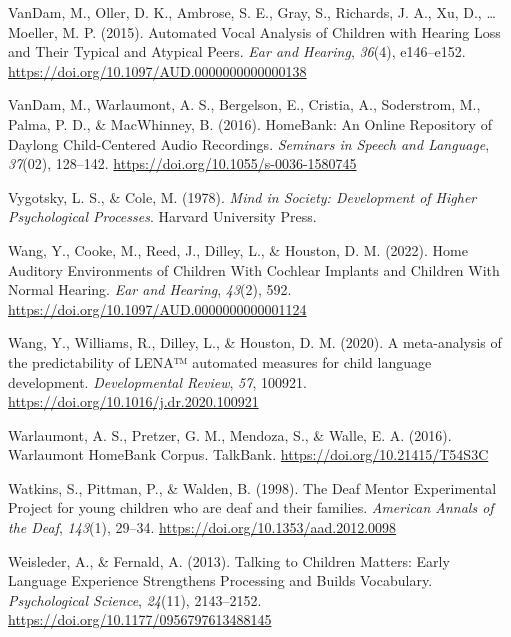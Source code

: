 \documentclass[
  man]{apa6}
\newlength{\cslhangindent}
\newlength{\cslentryspacingunit} %
\newenvironment{CSLReferences}[2] %
 {%
  \setlength{\parindent}{0pt}
  \ifodd #1
  \let\oldpar\par
  \def\par{\hangindent=\cslhangindent\oldpar}
  \fi
  \setlength{\parskip}{#2\cslentryspacingunit}
 }%
 {}
\begin{document}
\begin{CSLReferences}{1}{0}
\leavevmode{}%
VanDam, M., Oller, D. K., Ambrose, S. E., Gray, S., Richards, J. A., Xu, D., \ldots{} Moeller, M. P. (2015). Automated {Vocal Analysis} of {Children} with {Hearing Loss} and {Their Typical} and {Atypical Peers}. \emph{Ear and Hearing}, \emph{36}(4), e146--e152. \url{https://doi.org/10.1097/AUD.0000000000000138}

\leavevmode{}%
VanDam, M., Warlaumont, A. S., Bergelson, E., Cristia, A., Soderstrom, M., Palma, P. D., \& MacWhinney, B. (2016). {HomeBank}: {An Online Repository} of {Daylong Child-Centered Audio Recordings}. \emph{Seminars in Speech and Language}, \emph{37}(02), 128--142. \url{https://doi.org/10.1055/s-0036-1580745}

\leavevmode{}%
Vygotsky, L. S., \& Cole, M. (1978). \emph{Mind in {Society}: {Development} of {Higher Psychological Processes}}. {Harvard University Press}.

\leavevmode{}%
Wang, Y., Cooke, M., Reed, J., Dilley, L., \& Houston, D. M. (2022). Home {Auditory Environments} of {Children With Cochlear Implants} and {Children With Normal Hearing}. \emph{Ear and Hearing}, \emph{43}(2), 592. \url{https://doi.org/10.1097/AUD.0000000000001124}

\leavevmode{}%
Wang, Y., Williams, R., Dilley, L., \& Houston, D. M. (2020). A meta-analysis of the predictability of {LENA}™ automated measures for child language development. \emph{Developmental Review}, \emph{57}, 100921. \url{https://doi.org/10.1016/j.dr.2020.100921}

\leavevmode{}%
Warlaumont, A. S., Pretzer, G. M., Mendoza, S., \& Walle, E. A. (2016). Warlaumont {HomeBank Corpus}. {TalkBank}. \url{https://doi.org/10.21415/T54S3C}

\leavevmode{}%
Watkins, S., Pittman, P., \& Walden, B. (1998). The {Deaf Mentor Experimental Project} for young children who are deaf and their families. \emph{American Annals of the Deaf}, \emph{143}(1), 29--34. \url{https://doi.org/10.1353/aad.2012.0098}

\leavevmode{}%
Weisleder, A., \& Fernald, A. (2013). Talking to {Children Matters}: {Early Language Experience Strengthens Processing} and {Builds Vocabulary}. \emph{Psychological Science}, \emph{24}(11), 2143--2152. \url{https://doi.org/10.1177/0956797613488145}


\end{CSLReferences}
\end{document}
